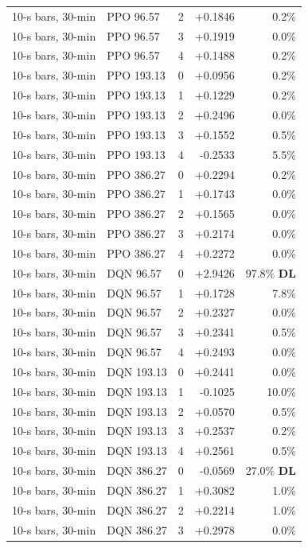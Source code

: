 \documentclass[11pt]{article}
\begin{document}
\begin{center}
\begin{longtable}{llrrr}
10-s bars, 30-min & PPO 96.57 & 2 & +0.1846 & 0.2\% \\
10-s bars, 30-min & PPO 96.57 & 3 & +0.1919 & 0.0\% \\
10-s bars, 30-min & PPO 96.57 & 4 & +0.1488 & 0.2\% \\
10-s bars, 30-min & PPO 193.13 & 0 & +0.0956 & 0.2\% \\
10-s bars, 30-min & PPO 193.13 & 1 & +0.1229 & 0.2\% \\
10-s bars, 30-min & PPO 193.13 & 2 & +0.2496 & 0.0\% \\
10-s bars, 30-min & PPO 193.13 & 3 & +0.1552 & 0.5\% \\
10-s bars, 30-min & PPO 193.13 & 4 & -0.2533 & 5.5\% \\
10-s bars, 30-min & PPO 386.27 & 0 & +0.2294 & 0.2\% \\
10-s bars, 30-min & PPO 386.27 & 1 & +0.1743 & 0.0\% \\
10-s bars, 30-min & PPO 386.27 & 2 & +0.1565 & 0.0\% \\
10-s bars, 30-min & PPO 386.27 & 3 & +0.2174 & 0.0\% \\
10-s bars, 30-min & PPO 386.27 & 4 & +0.2272 & 0.0\% \\
10-s bars, 30-min & DQN 96.57 & 0 & +2.9426 & 97.8\% \textbf{DL} \\
10-s bars, 30-min & DQN 96.57 & 1 & +0.1728 & 7.8\% \\
10-s bars, 30-min & DQN 96.57 & 2 & +0.2327 & 0.0\% \\
10-s bars, 30-min & DQN 96.57 & 3 & +0.2341 & 0.5\% \\
10-s bars, 30-min & DQN 96.57 & 4 & +0.2493 & 0.0\% \\
10-s bars, 30-min & DQN 193.13 & 0 & +0.2441 & 0.0\% \\
10-s bars, 30-min & DQN 193.13 & 1 & -0.1025 & 10.0\% \\
10-s bars, 30-min & DQN 193.13 & 2 & +0.0570 & 0.5\% \\
10-s bars, 30-min & DQN 193.13 & 3 & +0.2537 & 0.2\% \\
10-s bars, 30-min & DQN 193.13 & 4 & +0.2561 & 0.5\% \\
10-s bars, 30-min & DQN 386.27 & 0 & -0.0569 & 27.0\% \textbf{DL} \\
10-s bars, 30-min & DQN 386.27 & 1 & +0.3082 & 1.0\% \\
10-s bars, 30-min & DQN 386.27 & 2 & +0.2214 & 1.0\% \\
10-s bars, 30-min & DQN 386.27 & 3 & +0.2978 & 0.0\% \\

\end{longtable}
\end{center}
\end{document}
